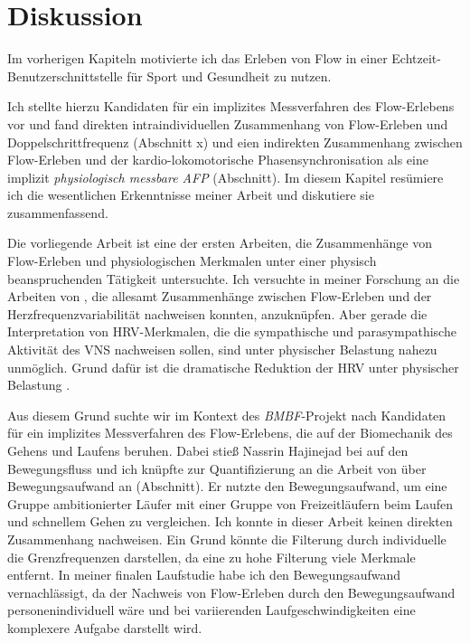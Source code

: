 \chapter{Diskussion}
\label{cha:diskussion}
Im vorherigen Kapiteln motivierte ich das Erleben von Flow in einer Echtzeit-Benutzerschnittstelle für Sport und Gesundheit zu nutzen. 

Ich stellte hierzu Kandidaten für ein implizites Messverfahren des Flow-Erlebens vor und fand direkten intraindividuellen Zusammenhang von Flow-Erleben und Doppelschrittfrequenz (Abschnitt x) und eien indirekten Zusammenhang zwischen Flow-Erleben und der kardio-lokomotorische Phasensynchronisation als eine implizit \emph{physiologisch messbare \ac{AFP}} (Abschnitt). Im diesem Kapitel resümiere ich die wesentlichen Erkenntnisse meiner Arbeit und diskutiere sie zusammenfassend. 

Die vorliegende Arbeit ist eine der ersten Arbeiten, die Zusammenhänge von Flow-Erleben und physiologischen Merkmalen unter einer physisch beanspruchenden Tätigkeit untersuchte. Ich versuchte in meiner Forschung an die Arbeiten von \citet{deManzano2010, Keller2011, Gaggioli2013, Peifer2014, Tozman2015}, die allesamt Zusammenhänge zwischen Flow-Erleben und der Herzfrequenzvariabilität nachweisen konnten, anzuknüpfen. Aber gerade die Interpretation von HRV-Merkmalen, die die sympathische und parasympathische Aktivität des \ac{VNS} nachweisen sollen, sind unter physischer Belastung nahezu unmöglich. Grund dafür ist die dramatische Reduktion der \ac{HRV} unter physischer Belastung \citep[][]{Hoos2010}. 

Aus diesem Grund suchte wir im Kontext des \emph{BMBF}-Projekt nach Kandidaten für ein implizites Messverfahren des Flow-Erlebens, die auf der Biomechanik des Gehens und Laufens beruhen. Dabei stieß Nassrin Hajinejad bei \citet[][S.~121]{Meinel2007} auf den Bewegungsfluss und ich knüpfte zur Quantifizierung an die Arbeit von \citet{Hreljac2000} über Bewegungsaufwand an (Abschnitt). Er nutzte den Bewegungsaufwand, um eine Gruppe ambitionierter Läufer mit einer Gruppe von Freizeitläufern beim Laufen und schnellem Gehen zu vergleichen. Ich konnte in dieser Arbeit keinen direkten Zusammenhang nachweisen. Ein Grund könnte die Filterung durch individuelle die Grenzfrequenzen darstellen, da eine zu hohe Filterung viele Merkmale entfernt. 
In meiner finalen Laufstudie habe ich den Bewegungsaufwand vernachlässigt, da der Nachweis von Flow-Erleben durch den Bewegungsaufwand personenindividuell wäre und bei variierenden Laufgeschwindigkeiten eine komplexere Aufgabe darstellt wird.

